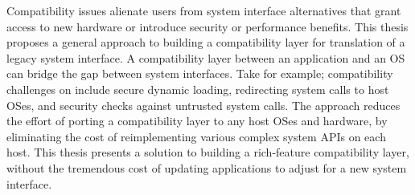 Compatibility issues alienate users from
system interface alternatives that grant access
to new hardware or 
introduce security or performance benefits.
This thesis proposes a general approach to building a compatibility layer
for translation of a legacy system interface.
A compatibility layer between an application and an OS
can bridge the gap between system interfaces.
Take \sgx{} for example;
compatibility challenges on \sgx{} include
secure dynamic loading,
redirecting system calls to host OSes, and security checks against untrusted system calls.
The approach
reduces the effort of porting a compatibility layer
to any host OSes and hardware,
by eliminating the cost of reimplementing
various complex system APIs on each host.%
This thesis presents a solution to building a rich-feature compatibility layer,
without the tremendous cost
of updating applications to adjust
for a new system interface.









